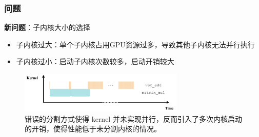 \documentclass[aspectratio=169]{ctexbeamer}
\begin{document}
\begin{frame}
  \frametitle{问题}
  \textbf{新问题}：子内核大小的选择
  \begin{itemize}
    \item 子内核过大：单个子内核占用GPU资源过多，导致其他子内核无法并行执行
    \item 子内核过小：启动子内核次数较多，启动开销较大
  \end{itemize}
  \footnotesize{\begin{figure}
    \includegraphics[width=0.7\textwidth]{figures/bad_cosched.drawio.pdf}
    \caption{错误的分割方式使得 kernel 并未实现并行，反而引入了多次内核启动的开销，使得性能低于未分割内核的情况。}
  \end{figure}}
\end{frame}
\end{document}
